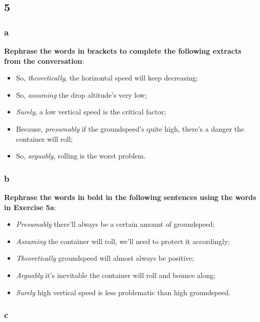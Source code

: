 \subsection{5}

\subsubsection{a}

\textbf{Rephrase the words in brackets to complete the following extracts from the conversation}:

\begin{itemize}

\item So, \textit{theoretically}, the horizontal speed will keep decreasing;
\item So, \textit{assuming} the drop altitude's very low;
\item \textit{Surely}, a low vertical speed is the critical factor;
\item Because, \textit{presumably} if the groundspeed's quite high, there's a danger the container will roll;
\item So, \textit{arguably}, rolling is the worst problem.

\end{itemize}

\subsubsection{b}

\textbf{Rephrase the words in bold in the following sentences using the words in Exercise 5a}:

\begin{itemize}

\item \textit{Presumably} there'll always be a certain amount of groundspeed;
\item \textit{Assuming} the container will roll, we'll need to protect it accordingly;
\item \textit{Theoretically} groundspeed will almost always be positive;
\item \textit{Arguably} it's inevitable the container will roll and bounce along;
\item \textit{Surely} high vertical speed is less problematic than high groundspeed.

\end{itemize}

\subsubsection{c}

